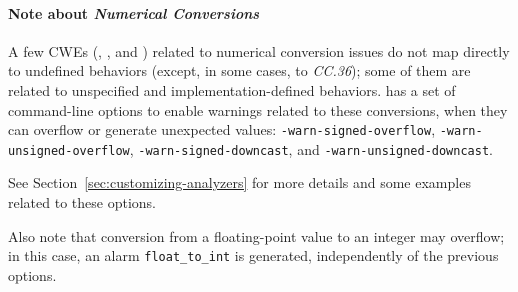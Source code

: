 \paragraph{Note about {\em Numerical Conversions}}

A few CWEs (, ,  and ) related to numerical
conversion issues do not map directly to undefined behaviors
(except, in some cases, to {\em CC.36});
some of them are related to unspecified and implementation-defined behaviors.
\FramaC has a set of command-line options to enable warnings related to these
conversions, when they can overflow or generate unexpected values:
\texttt{-warn-signed-overflow}, \texttt{-warn-unsigned-overflow},
\texttt{-warn-signed-downcast}, and \texttt{-warn-unsigned-downcast}.

See Section~\ref{sec:customizing-analyzers} for more details and some examples
related to these options.

Also note that conversion from a floating-point value to an integer may
overflow; in this case, an alarm \texttt{float\_to\_int} is generated,
independently of the previous options.

\renewenvironment{longtable}{\oldlongtable} {
\endoldlongtable}

